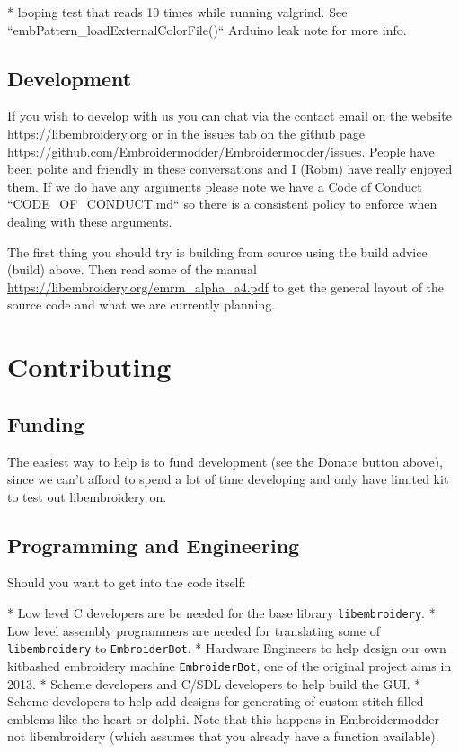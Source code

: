 \documentclass[a4paper]{report}
\begin{document}
* looping test that reads 10 times while running valgrind. See ``embPattern\_loadExternalColorFile()`` Arduino leak note for more info.

\subsection{Development}

If you wish to develop with us you can chat via the contact email
on the website https://libembroidery.org or in the issues tab on the
github page https://github.com/Embroidermodder/Embroidermodder/issues.
People have been polite and friendly in these conversations and I (Robin)
have really enjoyed them.
If we do have any arguments please note we have a
Code of Conduct ``CODE\_OF\_CONDUCT.md`` so there is a consistent policy to
enforce when dealing with these arguments.

The first thing you should try is building from source using the  build advice (build)
above. Then read some of the  manual
\url{https://libembroidery.org/emrm_alpha_a4.pdf} to get the general
layout of the source code and what we are currently planning.

\section{Contributing}

\subsection{Funding}

The easiest way to help is to fund development (see the Donate button above),
since we can't afford to spend a lot of time developing and only have limited
kit to test out libembroidery on.

\subsection{Programming and Engineering}

Should you want to get into the code itself:

* Low level C developers are be needed for the base library \texttt{libembroidery}.
* Low level assembly programmers are needed for translating some of \texttt{libembroidery} to \texttt{EmbroiderBot}.
* Hardware Engineers to help design our own kitbashed embroidery machine \texttt{EmbroiderBot}, one of the original project aims in 2013.
* Scheme developers and C/SDL developers to help build the GUI.
* Scheme developers to help add designs for generating of custom stitch-filled emblems like the heart or dolphi. Note that this happens in Embroidermodder not libembroidery (which assumes that you already have a function available).
\end{document}
